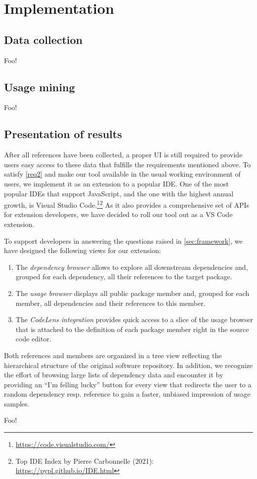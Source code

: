 \section{Implementation}
\label{sec:implementation}

\subsection{Data collection}
\label{sec:implementation/data_collection}

Foo!

\subsection{Usage mining}
\label{sec:implementation/usage_mining}

Foo!

\subsection{Presentation of results}
\label{sec:implementation/presentation}

After all references have been collected, a proper UI is still required to provide users easy access to these data that fulfills the requirements mentioned above.
To satisfy \cref{req2} and make our tool available in the usual working environment of users, we implement it as an extension to a popular IDE.
One of the most popular IDEs that support JavaScript, and the one with the highest annual growth, is Visual Studio Code.\footnote{\url{https://code.visualstudio.com/}}\footnote{Top IDE Index by Pierre Carbonnelle (2021): \url{https://pypl.github.io/IDE.html}}
As it also provides a comprehensive set of APIs for extension developers, we have decided to roll our tool out as a VS Code extension.

To support developers in answering the questions raised in \cref{sec:framework}, we have designed the following views for our extension:

\begin{enumerate}[label=(\roman*)]
	\item The \emph{dependency browser} allows to explore all downstream dependencies and, grouped for each dependency, all their references to the target package.
	\item The \emph{usage browser} displays all public package member and, grouped for each member, all dependencies and their references to this member.
	\item The \emph{CodeLens integration} provides quick access to a slice of the usage browser that is attached to the definition of each package member right in the source code editor.
\end{enumerate}

Both references and members are organized in a tree view reflecting the hierarchical structure of the original software repository.
In addition, we recognize the effort of browsing large lists of dependency data and encounter it by providing an ``I'm felling lucky'' button for every view that redirects the user to a random dependency resp. reference to gain a faster, unbiased impression of usage samples.

Foo!
